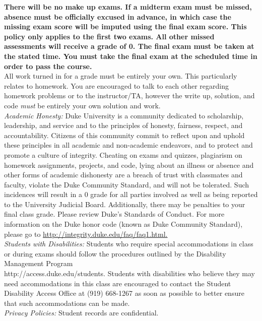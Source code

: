 \documentclass[11pt]{article}
\begin{document}
\textbf{There will be no make up exams. If a midterm exam must be missed, absence must be officially excused in advance, in which case the missing exam score will be imputed using the final exam score. This policy only applies to the first \textbf{two} exams. All other missed assessments will receive a grade of 0. The final exam must be taken at the stated time. You must take the final exam at the scheduled time in order to pass the course.}\\

All work turned in for a grade must be entirely your own. This particularly relates to homework. You are encouraged to talk to each other regarding homework problems or to the instructor/TA, however the write up, solution, and code \emph{must} be entirely your own solution and work. \\


\emph{Academic Honesty:} Duke University is a community dedicated to scholarship, leadership, and service and to the principles of honesty, fairness, respect, and accountability. Citizens of this community commit to reflect upon and uphold these principles in all academic and non-academic endeavors, and to protect and promote a culture of integrity. Cheating on exams and quizzes, plagiarism on homework assignments, projects, and code, lying about an illness or absence and other forms of academic dishonesty are a breach of trust with classmates and faculty, violate the Duke Community Standard, and will not be tolerated. Such incidences will result in a 0 grade for all parties involved as well as being reported to the University Judicial Board. Additionally, there may be penalties to your final class grade. Please review Duke's Standards of Conduct.
For more information on the Duke honor code (known as Duke Community Standard), please go to \url{http://integrity.duke.edu/faq/faq1.html.}\\


\emph{Students with Disabilities:} Students who require special accommodations in class or during exams should follow the procedures outlined by the Disability Management Program \\ http://access.duke.edu/students. Students with disabilities who believe they may need accommodations in this class are encouraged to contact the Student Disability Access Office at (919) 668-1267 as soon as possible to better ensure that such accommodations can be made. \\

\emph{Privacy Policies:} 
Student records are confidential. 
\end{document}
